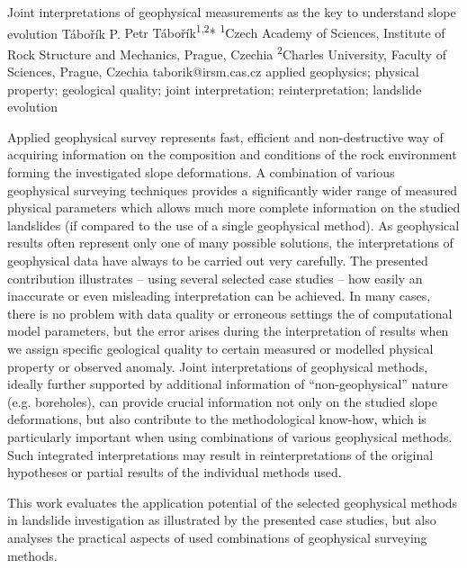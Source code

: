 \abstract
{Joint interpretations of geophysical measurements as the key to understand slope evolution} 
{Tábořík P.} 
{Petr Tábořík\textsuperscript{1,2}*} 
{\POtag} 
{
	\textsuperscript{1}Czech Academy of Sciences, Institute of Rock Structure and Mechanics, Prague, Czechia
	\textsuperscript{2}Charles University, Faculty of Sciences, Prague, Czechia
}
{taborik@irsm.cas.cz}  %
{applied geophysics; physical property; geological quality; joint interpretation; reinterpretation; landslide evolution}
{Applied geophysical survey represents fast, efficient and non-destructive way of acquiring information on the composition and conditions of the rock environment forming the investigated slope deformations. A combination of various geophysical surveying techniques provides a significantly wider range of measured physical parameters which allows much more complete information on the studied landslides (if compared to the use of a single geophysical method). As geophysical results often represent only one of many possible solutions, the interpretations of geophysical data have always to be carried out very carefully. The presented contribution illustrates -- using several selected case studies -- how easily an inaccurate or even misleading interpretation can be achieved. In many cases, there is no problem with data quality or erroneous settings the of computational model parameters, but the error arises during the interpretation of results when we assign specific geological quality to certain measured or modelled physical property or observed anomaly. Joint interpretations of geophysical methods, ideally further supported by additional information of \enquote{non-geophysical} nature (e.g. boreholes), can provide crucial information not only on the studied slope deformations, but also contribute to the methodological know-how, which is particularly important when using combinations of various geophysical methods. Such integrated interpretations may result in reinterpretations of the original hypotheses or partial results of the individual methods used.

This work evaluates the application potential of the selected geophysical methods in landslide investigation as illustrated by the presented case studies, but also analyses the practical aspects of used combinations of geophysical surveying methods. 
}
{
}

